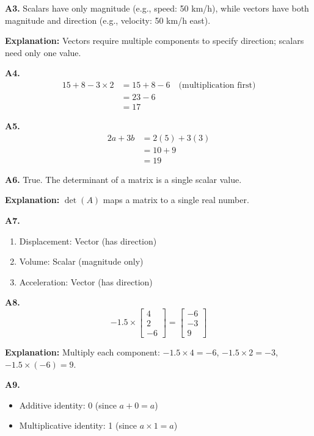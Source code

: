 \documentclass[11pt,a4paper]{article}
\begin{document}
\textbf{A3.} Scalars have only magnitude (e.g., speed: 50 km/h), while vectors have both magnitude and direction (e.g., velocity: 50 km/h east).

\textbf{Explanation:} Vectors require multiple components to specify direction; scalars need only one value.

\textbf{A4.}
\begin{align*}
    15 + 8 - 3 \times 2 &= 15 + 8 - 6 \quad \text{(multiplication first)} \\
    &= 23 - 6 \\
    &= 17
\end{align*}

\textbf{A5.}
\begin{align*}
    2a + 3b &= 2(5) + 3(3) \\
    &= 10 + 9 \\
    &= 19
\end{align*}

\textbf{A6.} True. The determinant of a matrix is a single scalar value.

\textbf{Explanation:} $\det(A)$ maps a matrix to a single real number.

\textbf{A7.}
\begin{enumerate}[label=(\alph*)]
    \item Displacement: Vector (has direction)
    \item Volume: Scalar (magnitude only)
    \item Acceleration: Vector (has direction)
\end{enumerate}

\textbf{A8.}
\begin{equation*}
    -1.5 \times \begin{bmatrix} 4 \\ 2 \\ -6 \end{bmatrix} = \begin{bmatrix} -6 \\ -3 \\ 9 \end{bmatrix}
\end{equation*}

\textbf{Explanation:} Multiply each component: $-1.5 \times 4 = -6$, $-1.5 \times 2 = -3$, $-1.5 \times (-6) = 9$.

\textbf{A9.}
\begin{itemize}
    \item Additive identity: 0 (since $a + 0 = a$)
    \item Multiplicative identity: 1 (since $a \times 1 = a$)
\end{itemize}
\end{document}

